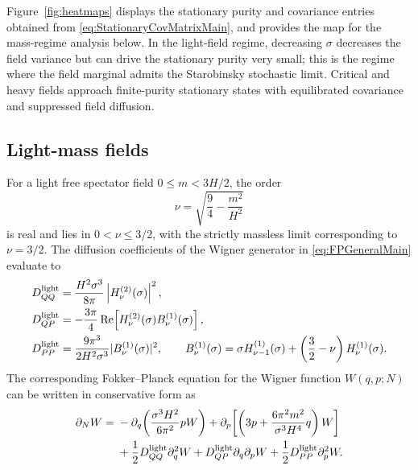 \documentclass{article}
\numberwithin{equation}{section}
\begin{document}
Figure~\ref{fig:heatmaps} displays the stationary purity and covariance entries obtained from \cref{eq:StationaryCovMatrixMain}, and provides the map for the mass-regime analysis below. In the light-field regime, decreasing \(\sigma\) decreases the field variance but can drive the stationary purity very small; this is the regime where the field marginal admits the Starobinsky stochastic limit. Critical and heavy fields approach finite-purity stationary states with equilibrated covariance and suppressed field diffusion.


\subsection{Light-mass fields}
\label{sec:light_mass_limit}

For a light free spectator field \(0\leq m<3H/2\), the order
\begin{equation}
    \nu=\sqrt{\frac94-\frac{m^2}{H^2}}
\end{equation}
is real and lies in \(0<\nu\leq 3/2\), with the strictly massless limit corresponding to \(\nu=3/2\). The diffusion coefficients of the Wigner generator in \cref{eq:FPGeneralMain} evaluate to
\begin{align}
    D_{QQ}^{\rm light}
    &=
    \frac{H^2\sigma^3}{8\pi}
    \left|H_\nu^{(2)}(\sigma)\right|^2 ,
    \label{eq:DQQLightMain}
    \\
    D_{QP}^{\rm light}
    &=-\frac{3\pi}{4}\operatorname{Re}\!\left[
      H_\nu^{(2)}(\sigma)B_\nu^{(1)}(\sigma)\right],
    \label{eq:DQPLightMain}
    \\
    D_{PP}^{\rm light}
    &=\frac{9\pi^3}{2H^2\sigma^3}|B_\nu^{(1)}(\sigma)|^2,
    \qquad B_\nu^{(1)}(\sigma)=\sigma H_{\nu-1}^{(1)}(\sigma)
       +\left(\frac32-\nu\right)H_\nu^{(1)}(\sigma).
    \label{eq:DPPLightMain}
\end{align}
The corresponding Fokker--Planck equation for the Wigner function \(W(q,p;N)\) can be written in conservative form as
\begin{align}
    \partial_N W
    ={}&
    -\partial_q\!\left(
    \frac{\sigma^3H^2}{6\pi^2}pW
    \right)
    +
    \partial_p\!\left[
    \left(
    3p+\frac{6\pi^2m^2}{\sigma^3H^4}q
    \right)W
    \right]
    \nonumber
    \\
    &+
    \frac12D_{QQ}^{\rm light}\partial_q^2W
    +
    D_{QP}^{\rm light}\partial_q\partial_pW
    +
    \frac12D_{PP}^{\rm light}\partial_p^2W .
    \label{eq:FPLightConservativeMain}
\end{align}
\end{document}
